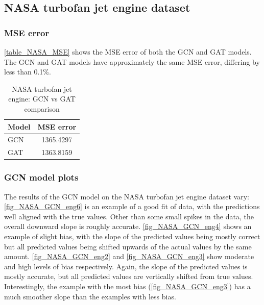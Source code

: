 \documentclass[12pt]{article}
\begin{document}
\subsection{NASA turbofan jet engine dataset}

\subsubsection{MSE error}

\autoref{table_NASA_MSE} shows the MSE error of both the GCN and GAT models. The GCN and GAT models have approximately the same MSE error, differing by less than 0.1\%. 

\begin{table}[H]
\centering
\caption{NASA turbofan jet engine: GCN vs GAT comparison}
\begin{tabular}{|l|c|}
\hline
\textbf{Model} & \textbf{MSE error}\\
\hline
GCN & 1365.4297  \\
GAT & 1363.8159  \\
\hline
\end{tabular}
\label{table_NASA_MSE}
\end{table}

\subsubsection{GCN model plots}
The results of the GCN model on the NASA turbofan jet engine dataset vary: \autoref{fig_NASA_GCN_eng6} is an example of a good fit of data, with the predictions well aligned with the true values. Other than some small spikes in the data, the overall downward slope is roughly accurate. \autoref{fig_NASA_GCN_eng4} shows an example of slight bias, with the slope of the predicted values being mostly correct but all predicted values being shifted upwards of the actual values by the same amount. \autoref{fig_NASA_GCN_eng2} and \autoref{fig_NASA_GCN_eng3} show moderate and high levels of bias respectively. Again, the slope of the predicted values is mostly accurate, but all predicted values are vertically shifted from true values. Interestingly, the example with the most bias (\autoref{fig_NASA_GCN_eng3}) has a much smoother slope than the examples with less bias. 
\end{document}
